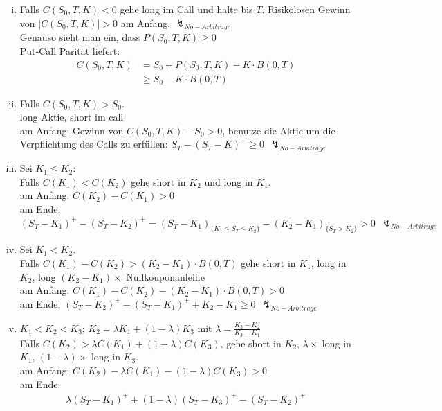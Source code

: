 \documentclass[a4paper, pagesize=pdftex, pdftex, twoside, headsepline, index=totoc,toc=listof, fontsize=10pt, cleardoublepage=empty, headinclude, DIV=13, BCOR=13mm]{scrartcl}
\newcommand{\abs}[1]{\ensuremath{\left\vert#1\right\vert}}
\begin{document}
\begin{enumerate}[(i)]
	\item Falls $C(S_0,T,K) < 0$ gehe long im Call und halte bis $T$. Risikolosen Gewinn von $\abs{C(S_0,T,K)}> 0$ am Anfang. $\lightning_{No-Arbitrage}$\\
	Genauso sieht man ein, dass $P(S_0;T,K)\ge 0$\\
	Put-Call Parität liefert:
	\begin{equation*}
		\begin{aligned}
			C(S_0,T,K)&=S_0 + P(S_0,T,K)-K\cdot B(0,T)\\
			&\ge S_0 - K\cdot B(0,T)
		\end{aligned}
	\end{equation*}
	\item  Falls $C(S_0,T,K) >S_0$.\\
	long Aktie, short im call\\
	am Anfang: Gewinn von $C(S_0,T,K) -S_0>0$, benutze die Aktie um die Verpflichtung des Calls zu erfüllen: $S_T - (S_T-K)^+ \ge 0~~\lightning_{No-Arbitrage}$
	\item Sei $K_1 \le K_2$:\\
	Falls $C(K_1)<C(K_2)$ gehe  short in $K_2$ und long in $K_1$.\\
	am Anfang: $C(K_2) - C(K_1) > 0$\\
	am Ende: $(S_T-K_1)^+ -(S_T-K_2)^+ = (S_T-K_1)_{\{K_1\le S_T\le K_2\}}-(K_2-K_1)_{\{S_T>K_2\}}>0~~ \lightning_{No-Arbitrage}$
	\item Sei $K_1<K_2$.\\
	Falls $C(K_1)-C(K_2)>(K_2-K_1)\cdot B(0,T)$ gehe short in $K_1$, long in $K_2$, long $(K_2-K_1)\times$ Nullkouponanleihe\\ 
	am Anfang: $C(K_1)-C(K_2)-(K_2-K_1)\cdot B(0,T)>0$\\
	am Ende: $(S_T-K_2)^+ -(S_T-K_1)^+ +K_2-K_1 \ge 0~~ \lightning_{No-Arbitrage}$
	\item $K_1<K_2<K_3$; $K_2=\lambda K_1+(1-\lambda)K_3$ mit $\lambda=\frac{K_3-K_2}{K_3-K_1}$\\
	Falls $C(K_2)> \lambda C(K_1)+ (1-\lambda)C(K_3)$, gehe short in $K_2$, $\lambda \times$ long in $K_1$, $(1-\lambda) \times$ long in $K_3$.\\
	am Anfang: $C(K_2)-\lambda C(K_1)-(1-\lambda)C(K_3)>0$\\
	am Ende: 
	\begin{equation*}
	\begin{aligned}
		\lambda (S_T -K_1)^+ +(1-\lambda)(S_T-K_3)^+-(S_T-K_2)^+

\end{aligned}
\end{equation*}
\end{enumerate}
\end{document}
